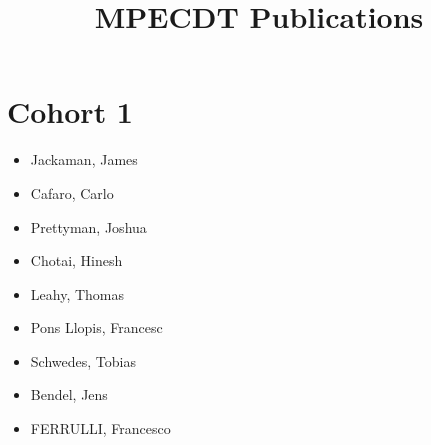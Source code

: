 \documentclass{article}
\title{MPECDT Publications}
\author{}
\date{}
\begin{document}
\maketitle
\section*{Cohort 1}
\begin{itemize}
    \item Jackaman, James \cite{jackaman2019design, jackaman2020quasinorms}
    \item Cafaro, Carlo \cite{cafaro2019added, cafaro2018characteristics}
    \item Prettyman, Joshua \cite{prettyman2018novel, prettyman2019generalized}
    \item Chotai, Hinesh \cite{chassagneux2017forward, chassagneux2017introduction, chassagneux2017mathematical, chassagneux2017description, chassagneux2017numerical,chassagneux2017case}
    \item Leahy, Thomas \cite{leahy2018using}
    \item Pons Llopis, Francesc \cite{llopis2018particle,leahy2018using}
    \item Schwedes, Tobias \cite{schwedes2017mesh,schwedes2017introduction, schwedes2017application}
    \item Bendel, Jens
    \item FERRULLI, Francesco \cite{safronov2019eigenvalues, ferrulli2020complex}
\end{itemize}
\end{document}
